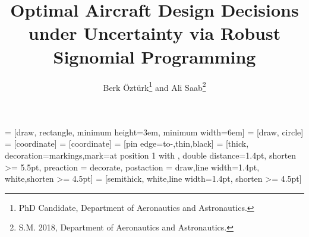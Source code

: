 \title{Optimal Aircraft Design Decisions under Uncertainty via Robust Signomial Programming}

\author{Berk {\"O}zt{\"u}rk\footnote{PhD Candidate, Department of Aeronautics and Astronautics.}
and Ali Saab\footnote{S.M. 2018, Department of Aeronautics and Astronautics.}}


\newcommand{\eqnref}[1]{(\ref{#1})}
\newcommand{\class}[1]{\texttt{#1}}
\newcommand{\package}[1]{\texttt{#1}}
\newcommand{\file}[1]{\texttt{#1}}
\newcommand{\BibTeX}{\textsc{Bib}\TeX}

\renewcommand{\vec}{\mathbf}
\newcommand{\mat}{\mathbf}

\usepackage[utf8]{inputenc}
\usepackage{bbm}
\usepackage{booktabs}
\usepackage{amsmath}
\usepackage{csvsimple}
\usepackage{filecontents}
\usepackage{float}
\usepackage[acronyms]{glossaries}
\usepackage{natbib}
\usepackage[toc,page]{appendix}
\usepackage{tikz}
\usepackage{tkz-kiviat}
\usetikzlibrary{shapes, arrows, positioning, decorations.markings, fit}
\usepackage{pgfplotstable}
\usepackage{subcaption}
\usepackage{graphicx}
\makeglossaries

 = [draw, rectangle,
minimum height=3em, minimum width=6em]
 = [draw, circle]
 = [coordinate]
 = [coordinate]
 = [pin edge={to-,thin,black}]
 = [thick, decoration={markings,mark=at position
1 with {}},
double distance=1.4pt, shorten >= 5.5pt,
preaction = {decorate},
postaction = {draw,line width=1.4pt, white,shorten >= 4.5pt}]
 = [semithick, white,line width=1.4pt, shorten >= 4.5pt]

